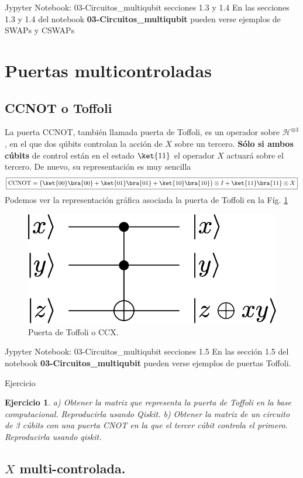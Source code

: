 \documentclass[a4paper,11pt]{book} %
\newtheorem{ejercicio_contador}{Ejercicio}
\newcommand{\Ejercicio}[1]{
		\begin{mybox_gray}{Ejercicio} 
			\begin{ejercicio_contador}
				 #1 
			\end{ejercicio_contador} 
		\end{mybox_gray}
	}
\numberwithin{equation}{chapter}
\begin{document}
	\begin{mybox_orange}{Jypyter Notebook: 03-Circuitos\_multiqubit secciones 1.3 y 1.4}
	En las secciones 1.3 y 1.4 del notebook \textbf{03-Circuitos\_multiqubit} pueden verse ejemplos de SWAPs y CSWAPs
	\end{mybox_orange}

    \section{Puertas multicontroladas}
		\subsection{CCNOT o Toffoli}
		
La puerta CCNOT, también llamada puerta de Toffoli,  es un operador sobre $\mathcal{H}^{\otimes 3}$, en el que dos qúbits controlan la acción de $X$ sobre un tercero. \textbf{Sólo si ambos cúbits} de control están en el estado $\ket{11}$ el operador $X$ actuará sobre el tercero. De nuevo, su representación es muy sencilla
	\begin{equation}
	\boxed{{\rm CCNOT} = \big(\ket{00}\bra{00}+\ket{01}\bra{01}+\ket{10}\bra{10}\big)\otimes I + \ket{11}\bra{11}\otimes X}
	\end{equation}
Podemos ver la representación gráfica asociada la puerta de Toffoli en la Fíg. \ref{Fig_multiqubit_ccX_gate}
	\begin{figure}[H]
	\centering 
	\includegraphics[width=0.22\linewidth]{Figuras/Fig_multiqubit_ccX_gate}
	\caption{Puerta de Toffoli o CCX.}
	\label{Fig_multiqubit_ccX_gate}
	\end{figure}
	
	\begin{mybox_orange}{Jypyter Notebook: 03-Circuitos\_multiqubit secciones 1.5}
	En las sección 1.5 del notebook \textbf{03-Circuitos\_multiqubit} pueden verse ejemplos de puertas Toffoli.
	\end{mybox_orange}

	\Ejercicio{
	a) Obtener la matriz que representa la puerta de Toffoli en la base computacional. Reproducirla usando Qiskit. b) Obtener la matriz de un circuito de 3 cúbits con una puerta CNOT en la que el tercer cúbit controla el primero. Reproducirla usando qiskit.
	}
	
		\subsection{$X$ multi-controlada.}
		
\end{document}
